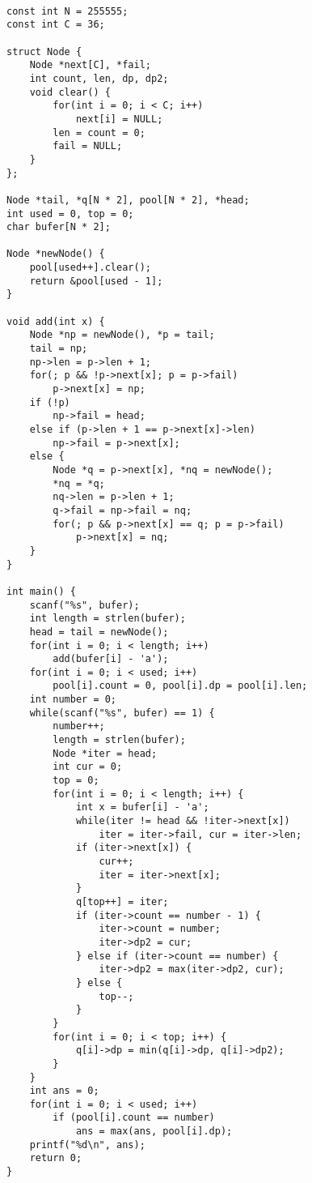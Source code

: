 \begin{lstlisting}

const int N = 255555;
const int C = 36;

struct Node {
	Node *next[C], *fail;
	int count, len, dp, dp2;
	void clear() {
		for(int i = 0; i < C; i++)
			next[i] = NULL;
		len = count = 0;
		fail = NULL;
	}
};

Node *tail, *q[N * 2], pool[N * 2], *head;
int used = 0, top = 0;
char bufer[N * 2];

Node *newNode() {
	pool[used++].clear();
	return &pool[used - 1];
}

void add(int x) {
	Node *np = newNode(), *p = tail;
	tail = np;
	np->len = p->len + 1;
	for(; p && !p->next[x]; p = p->fail)
		p->next[x] = np;
	if (!p)
		np->fail = head;
	else if (p->len + 1 == p->next[x]->len)
		np->fail = p->next[x];
	else {
		Node *q = p->next[x], *nq = newNode();
		*nq = *q; 
		nq->len = p->len + 1;
		q->fail = np->fail = nq;
		for(; p && p->next[x] == q; p = p->fail)
			p->next[x] = nq;
	}
}

int main() {
	scanf("%s", bufer);
	int length = strlen(bufer);
	head = tail = newNode();
	for(int i = 0; i < length; i++)
		add(bufer[i] - 'a');
	for(int i = 0; i < used; i++)
		pool[i].count = 0, pool[i].dp = pool[i].len;
	int number = 0;
	while(scanf("%s", bufer) == 1) {
		number++;
		length = strlen(bufer);
		Node *iter = head;
		int cur = 0;
		top = 0;
		for(int i = 0; i < length; i++) {
			int x = bufer[i] - 'a';
			while(iter != head && !iter->next[x])
				iter = iter->fail, cur = iter->len;
			if (iter->next[x]) {
				cur++;
				iter = iter->next[x];
			}
			q[top++] = iter; 
			if (iter->count == number - 1) {
				iter->count = number;
				iter->dp2 = cur;
			} else if (iter->count == number) {
				iter->dp2 = max(iter->dp2, cur);
			} else {
				top--;
			}
		}	
		for(int i = 0; i < top; i++) {
			q[i]->dp = min(q[i]->dp, q[i]->dp2);
		}
	}	
	int ans = 0;
	for(int i = 0; i < used; i++)
		if (pool[i].count == number)
			ans = max(ans, pool[i].dp);
	printf("%d\n", ans);
	return 0;
}
	\end{lstlisting}
